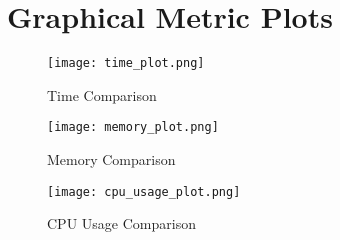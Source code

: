 \documentclass[acmsmall]{acmart}
\begin{document}
\section*{Graphical Metric Plots}
    
    \begin{figure} [H]
        \texttt{[image: time\_plot.png]}
        \caption{Time Comparison}    
    \end{figure}  

    \begin{figure} [H]
        \texttt{[image: memory\_plot.png]}
        \caption{Memory Comparison}    
    \end{figure}  

    \begin{figure} [H]
        \texttt{[image: cpu\_usage\_plot.png]}
        \caption{CPU Usage Comparison}    
    \end{figure}  
    
\end{document}
